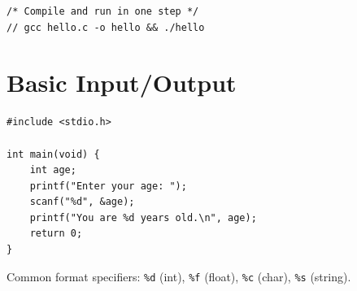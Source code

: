 \documentclass[11pt,a4paper]{article}
\begin{document}
\begin{lstlisting}
/* Compile and run in one step */
// gcc hello.c -o hello && ./hello
\end{lstlisting}

\section{Basic Input/Output}
\begin{lstlisting}
#include <stdio.h>

int main(void) {
    int age;
    printf("Enter your age: ");
    scanf("%d", &age);
    printf("You are %d years old.\n", age);
    return 0;
}
\end{lstlisting}

Common format specifiers: \texttt{\%d} (int), \texttt{\%f} (float),
\texttt{\%c} (char), \texttt{\%s} (string).
\end{document}
